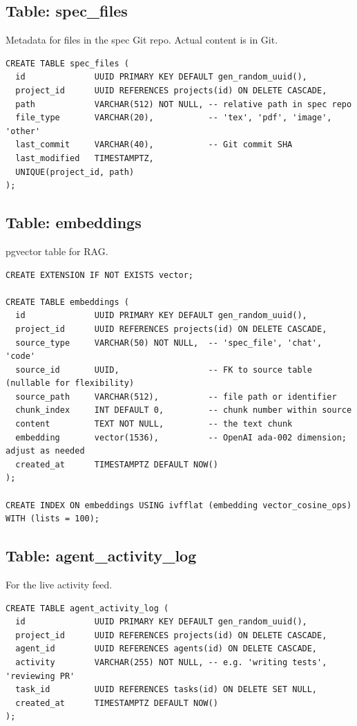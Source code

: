 \documentclass[11pt,a4paper]{article}
\begin{document}
\subsection{Table: spec\_files}

Metadata for files in the spec Git repo. Actual content is in Git.

\begin{lstlisting}
CREATE TABLE spec_files (
  id              UUID PRIMARY KEY DEFAULT gen_random_uuid(),
  project_id      UUID REFERENCES projects(id) ON DELETE CASCADE,
  path            VARCHAR(512) NOT NULL, -- relative path in spec repo
  file_type       VARCHAR(20),           -- 'tex', 'pdf', 'image', 'other'
  last_commit     VARCHAR(40),           -- Git commit SHA
  last_modified   TIMESTAMPTZ,
  UNIQUE(project_id, path)
);
\end{lstlisting}

\subsection{Table: embeddings}

pgvector table for RAG.

\begin{lstlisting}
CREATE EXTENSION IF NOT EXISTS vector;

CREATE TABLE embeddings (
  id              UUID PRIMARY KEY DEFAULT gen_random_uuid(),
  project_id      UUID REFERENCES projects(id) ON DELETE CASCADE,
  source_type     VARCHAR(50) NOT NULL,  -- 'spec_file', 'chat', 'code'
  source_id       UUID,                  -- FK to source table (nullable for flexibility)
  source_path     VARCHAR(512),          -- file path or identifier
  chunk_index     INT DEFAULT 0,         -- chunk number within source
  content         TEXT NOT NULL,         -- the text chunk
  embedding       vector(1536),          -- OpenAI ada-002 dimension; adjust as needed
  created_at      TIMESTAMPTZ DEFAULT NOW()
);

CREATE INDEX ON embeddings USING ivfflat (embedding vector_cosine_ops) WITH (lists = 100);
\end{lstlisting}

\subsection{Table: agent\_activity\_log}

For the live activity feed.

\begin{lstlisting}
CREATE TABLE agent_activity_log (
  id              UUID PRIMARY KEY DEFAULT gen_random_uuid(),
  project_id      UUID REFERENCES projects(id) ON DELETE CASCADE,
  agent_id        UUID REFERENCES agents(id) ON DELETE CASCADE,
  activity        VARCHAR(255) NOT NULL, -- e.g. 'writing tests', 'reviewing PR'
  task_id         UUID REFERENCES tasks(id) ON DELETE SET NULL,
  created_at      TIMESTAMPTZ DEFAULT NOW()
);
\end{lstlisting}
\end{document}
